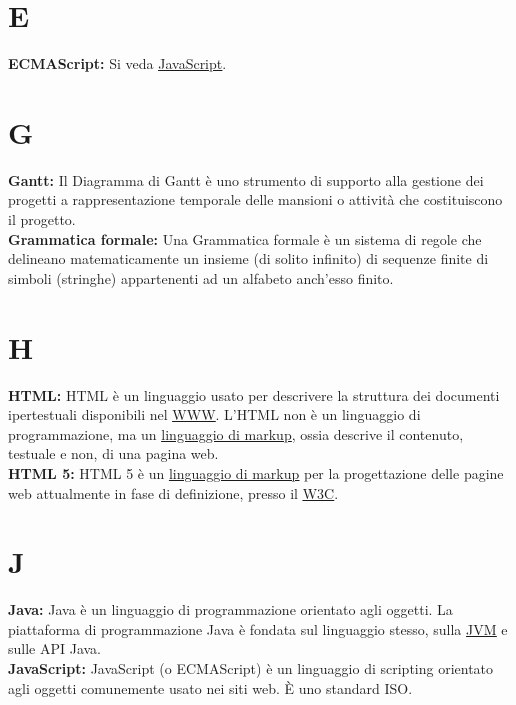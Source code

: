 \section*{E}
\hypertarget{ecmascript}{}
\textbf{ECMAScript:}
\text Si veda \hyperlink{javascript}{\underline{JavaScript}}.\\

\section*{G}
\hypertarget{gantt}{}
\textbf{Gantt:}
Il Diagramma di Gantt \` e uno strumento di supporto alla gestione dei progetti a rappresentazione temporale delle mansioni o attivit\`a che costituiscono il progetto. \\

\hypertarget{grmfrm}{}
\textbf{Grammatica formale:}
Una Grammatica formale \` e un sistema di regole che delineano matematicamente un insieme (di solito infinito) di sequenze finite di simboli (stringhe) appartenenti ad un alfabeto anch'esso finito.\\

\section*{H}
\hypertarget{html}{}
\textbf{HTML:}
HTML \` e un linguaggio usato per descrivere la struttura dei documenti ipertestuali disponibili nel \hyperlink{www}{\underline{WWW}}.
L'HTML non \` e un linguaggio di programmazione, ma un \hyperlink{linguaggio di markup}{\underline{linguaggio di markup}}, ossia descrive il contenuto, testuale e non, di una pagina web.\\

\hypertarget{html5}{}
\textbf{HTML 5:}
HTML 5 \` e un \hyperlink{linguaggio di markup}{\underline{linguaggio di markup}} per la progettazione delle pagine web attualmente in fase di definizione, presso il \hyperlink{w3c}{\underline{W3C}}.\\ 

\section*{J}
\hypertarget{java}{}
\textbf{Java:}
Java \`e un linguaggio di programmazione orientato agli oggetti. La piattaforma di programmazione Java \`e fondata sul linguaggio stesso, sulla \hyperlink{jvm}{\underline{JVM}} e sulle API Java.\\

\hypertarget{javascript}{}
\textbf{JavaScript:}
JavaScript (o ECMAScript) \`e un linguaggio di scripting orientato agli oggetti comunemente usato nei siti web. \`E  uno standard ISO.\\

